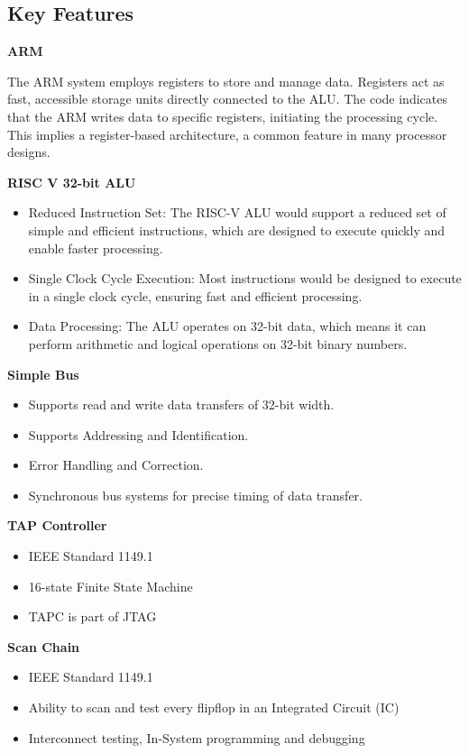 \documentclass[a4paper,12pt,english]{report}
\begin{document}
\subsection{Key Features}
 \item \textbf {ARM}
\begin{itemize}
  The ARM system employs registers to store and manage data. Registers act as fast, accessible
storage units directly connected to the ALU. The code indicates that the ARM writes data to
specific registers, initiating the processing cycle. This implies a register-based architecture, a
common feature in many processor designs.
 \end{itemize}
   \item \textbf{RISC V 32-bit ALU}
  \begin{itemize}
    \item Reduced Instruction Set: The RISC-V ALU would support a reduced set of simple and efficient instructions, which are designed to execute quickly and enable faster processing.
    \item Single Clock Cycle Execution: Most instructions would be designed to execute in a single clock cycle, ensuring fast and efficient processing.
    \item Data Processing: The ALU operates on 32-bit data, which means it can perform arithmetic and logical operations on 32-bit binary numbers.
  \end{itemize}
  \item \textbf{Simple Bus}
  \begin{itemize}
    \item Supports read and write data transfers of 32-bit width.
    \item Supports Addressing and Identification.
    \item Error Handling and Correction.
    \item Synchronous bus systems for precise timing of data transfer.
  \end{itemize}
   \item \textbf {TAP Controller}
  \begin{itemize}
 
    \item IEEE Standard 1149.1
    \item 16-state Finite State Machine
    \item TAPC is part of JTAG
  \end{itemize}
  
   \item \textbf {Scan Chain}
  \begin{itemize}
 
    \item IEEE Standard 1149.1
    \item Ability to scan and test every flipflop in an Integrated Circuit (IC)
    \item Interconnect testing, In-System programming and debugging
  \end{itemize}
\newpage
\end{document}
